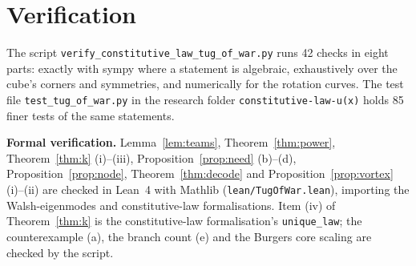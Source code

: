 \documentclass[twocolumn]{iopjournal}
\theoremstyle{definition}
\theoremstyle{remark}
\begin{document}
\section*{Verification}

The script \texttt{verify\_constitutive\_law\_tug\_of\_war.py} runs 42
checks in eight parts: exactly with sympy where a statement is algebraic,
exhaustively over the cube's corners and symmetries, and numerically for
the rotation curves. The test file \texttt{test\_tug\_of\_war.py} in the
research folder \texttt{constitutive-law-u(x)} holds 85 finer tests of the
same statements.

\textbf{Formal verification.} Lemma~\ref{lem:teams},
Theorem~\ref{thm:power}, Theorem~\ref{thm:k} (i)--(iii),
Proposition~\ref{prop:need} (b)--(d), Proposition~\ref{prop:node},
Theorem~\ref{thm:decode} and Proposition~\ref{prop:vortex} (i)--(ii) are
checked in Lean~4 with Mathlib (\texttt{lean/TugOfWar.lean}), importing the
Walsh-eigenmodes and constitutive-law formalisations. Item (iv) of
Theorem~\ref{thm:k} is the constitutive-law formalisation's
\texttt{unique\_law}; the counterexample (a), the branch count (e) and the
Burgers core scaling are checked by the script.
\end{document}
